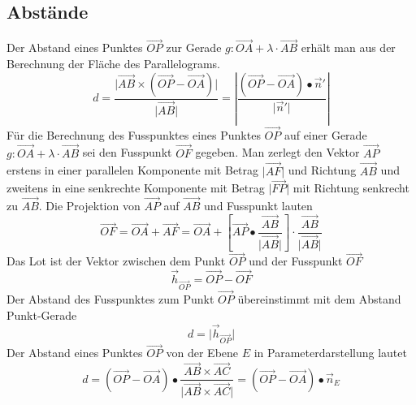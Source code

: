 \subsection{Abstände}
Der Abstand eines Punktes $\overrightarrow{OP}$ zur Gerade $g:\overrightarrow{OA}+\lambda\cdot \overrightarrow{AB}$ erhält man aus der Berechnung der Fläche des Parallelograms. 
\begin{equation}
\boxed{d=\dfrac{\Big\vert\overrightarrow{AB}\times\left(\overrightarrow{OP}-\overrightarrow{OA}\right)\Big\vert}{\Big\vert\overrightarrow{AB}\Big\vert}=\left\vert\dfrac{\left(\overrightarrow{OP}-\overrightarrow{OA}\right)\bullet \overrightarrow{n}'}{\Big\vert\overrightarrow{n}'\Big\vert}\right\vert}
\end{equation}
Für die Berechnung des Fusspunktes eines Punktes $\overrightarrow{OP}$ auf einer Gerade $g:\overrightarrow{OA}+\lambda\cdot \overrightarrow{AB}$ sei den Fusspunkt $\overrightarrow{OF}$ gegeben. Man zerlegt den Vektor $\overrightarrow{AP}$ erstens in einer parallelen Komponente mit Betrag $\Big\vert\overrightarrow{AF}\Big\vert$ und Richtung $\overrightarrow{AB}$ und zweitens in eine senkrechte Komponente mit Betrag $\Big\vert\overrightarrow{FP}\Big\vert$ mit Richtung senkrecht zu $\overrightarrow{AB}$.
\newline\newline
Die Projektion von $\overrightarrow{AP}$ auf $\overrightarrow{AB}$ und Fusspunkt lauten
\begin{equation}
\boxed{\overrightarrow{OF}=\overrightarrow{OA}+\overrightarrow{AF}=\overrightarrow{OA}+\left[\overrightarrow{AP}\bullet \dfrac{\overrightarrow{AB}}{\Big\vert\overrightarrow{AB}\Big\vert}\right]\cdot \dfrac{\overrightarrow{AB}}{\Big\vert\overrightarrow{AB}\Big\vert}}
\end{equation}
Das Lot ist der Vektor zwischen dem Punkt $\overrightarrow{OP}$ und der Fusspunkt $\overrightarrow{OF}$
\begin{equation}
\boxed{\overrightarrow{h}_{\overrightarrow{OP}}=\overrightarrow{OP}-\overrightarrow{OF}}
\end{equation}
Der Abstand des Fusspunktes zum Punkt $\overrightarrow{OP}$ übereinstimmt mit dem Abstand Punkt-Gerade
\begin{equation}
\boxed{d=\Big\vert\overrightarrow{h}_{\overrightarrow{OP}}\Big\vert}
\end{equation}
Der Abstand eines Punktes $\overrightarrow{OP}$ von der Ebene $E$ in Parameterdarstellung lautet
\begin{equation}
\boxed{d=\left(\overrightarrow{OP}-\overrightarrow{OA}\right)\bullet \dfrac{\overrightarrow{AB}\times \overrightarrow{AC}}{\Big\vert\overrightarrow{AB}\times \overrightarrow{AC}\Big\vert}=\left(\overrightarrow{OP}-\overrightarrow{OA}\right)\bullet \overrightarrow{n}_E}
\end{equation}
